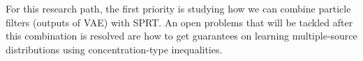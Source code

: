 \documentclass[english]{article}
\numberwithin{equation}{section}
\begin{document}
	For this research path, the first priority is studying how we can combine particle filters (outputs of VAE) with SPRT. An open problems that will be tackled after this combination is resolved are how to get guarantees on learning multiple-source distributions using concentration-type inequalities.
\end{document}
